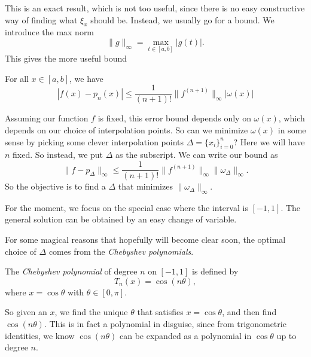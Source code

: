 \documentclass[a4paper]{article}
\begin{document}
This is an exact result, which is not too useful, since there is no easy constructive way of finding what $\xi_x$ should be. Instead, we usually go for a bound. We introduce the max norm
\[
  \|g\|_{\infty} = \max_{t \in [a, b]} |g(t)|.
\]
This gives the more useful bound
\begin{cor}
  For all $x \in [a, b]$, we have
  \[
    |f(x) - p_n(x)| \leq \frac{1}{(n + 1)!} \|f^{(n + 1)}\|_{\infty} |\omega(x)|
  \]
\end{cor}

Assuming our function $f$ is fixed, this error bound depends only on $\omega(x)$, which depends on our choice of interpolation points. So can we minimize $\omega(x)$ in some sense by picking some clever interpolation points $\Delta = \{x_i\}_{i = 0}^n$? Here we will have $n$ fixed. So instead, we put $\Delta$ as the subscript. We can write our bound as
\[
  \|f - p_{\Delta}\|_{\infty} \leq \frac{1}{(n + 1)!} \|f^{(n + 1)}\|_{\infty} \|\omega_{\Delta}\|_{\infty}.
\]
So the objective is to find a $\Delta$ that minimizes $\|\omega_{\Delta}\|_{\infty}$.

For the moment, we focus on the special case where the interval is $[-1, 1]$. The general solution can be obtained by an easy change of variable.

For some magical reasons that hopefully will become clear soon, the optimal choice of $\Delta$ comes from the \emph{Chebyshev polynomials}.
\begin{defi}
  The \emph{Chebyshev polynomial} of degree $n$ on $[-1, 1]$ is defined by
  \[
    T_n(x) = \cos(n \theta),
  \]
  where $x = \cos \theta$ with $\theta\in [0, \pi]$.
\end{defi}
So given an $x$, we find the unique $\theta$ that satisfies $x = \cos \theta$, and then find $\cos (n \theta)$. This is in fact a polynomial in disguise, since from trigonometric identities, we know $\cos (n\theta)$ can be expanded as a polynomial in $\cos \theta$ up to degree $n$.
\end{document}
